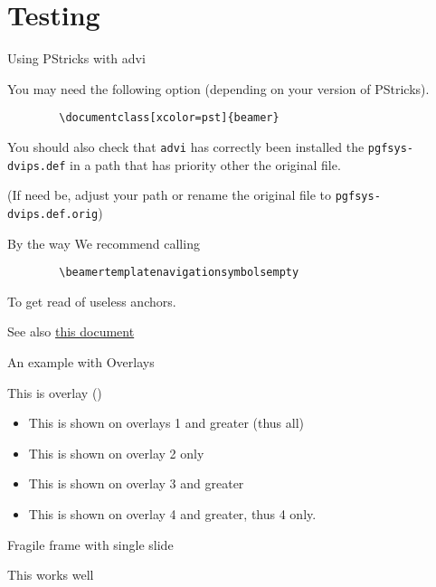 \documentclass[compress]{beamer}
\begin{document}
\section{Testing}
\begin{frame}[fragile=singleslide]{Using PStricks with advi}

You may need the following option (depending on your version of PStricks). 
\begin{verbatim}
        \documentclass[xcolor=pst]{beamer}
\end{verbatim}

You should also check that 
\texttt{advi} has correctly been installed the
\texttt{pgfsys-dvips.def} in a path that has priority other the original 
file. 

(If need be, adjust your path or rename the original file to
\texttt{pgfsys-dvips.def.orig})



\end{frame}
\begin{frame}[fragile=singleslide]{By the way}
We recommend calling
\begin{verbatim}
        \beamertemplatenavigationsymbolsempty
\end{verbatim}
To get read of useless anchors.

See also 
\href{http://www.giref.ulaval.ca/~ctibirna/work/readings/beamer_pstricks.pdf}
{this document} 

\end{frame}
\begin{frame}{An example with Overlays}

This is overlay ()

\begin{itemize}
\item<1-> This is shown on overlays 1 and greater (thus all)
\item<2> This is shown on overlay 2 only
\item<3-> This is shown on overlay 3 and greater
\item<4-> This is shown on overlay 4 and greater, thus  4 only.
\end{itemize}
\end{frame}
\begin{frame}[fragile=singleslide]{Fragile frame with single slide}

This works well
\end{frame}
\end{document}
